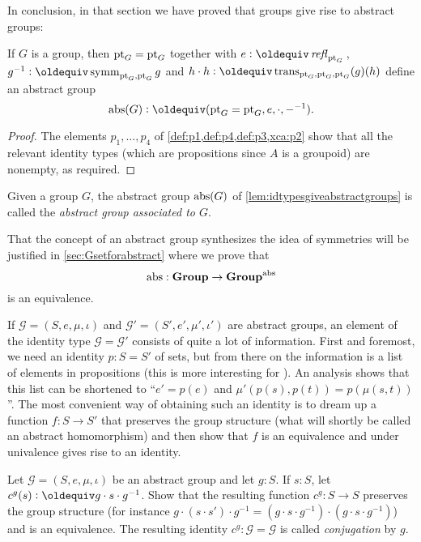 In conclusion, in that section we have proved that groups give rise to
abstract groups:
  \begin{lemma}\label{lem:idtypesgiveabstractgroups}
    If $G$ is a group, then $\mathrm{pt}_G=\mathrm{pt}_G$ together with $e\defequi\refl{\pt_G}{}$, $g^{-1}\defequi\symm_{\pt_G,\pt_G}g$ and $h\cdot h\defequi\trans_{\pt_G,\pt_G,\pt_G}(g)(h)$
define an abstract group
$$\abstr(G)\defequi (\pt_G=\pt_G,e,\cdot,{-}^{-1}).$$
  \end{lemma}
  \begin{proof}
    The elements $p_1,\dots, p_4$ of \cref{def:p1,def:p4,def:p3,xca:p2} show that all the relevant identity types (which are propositions since $A$ is a groupoid) are nonempty, as required.
  \end{proof}
  \begin{definition}\label{def:abstrG}
    Given a group $G$, the abstract group $\mathrm{abs}(G)$ of \cref{lem:idtypesgiveabstractgroups} is called the \emph{abstract group associated to $G$}.
  \end{definition}

 
\begin{remark}
  That the concept of an abstract group synthesizes the idea of symmetries will be justified in \cref{sec:Gsetforabstract} where we prove that 
$$\mathrm{abs}:\mathbf{Group}\to\mathbf{Group}^{\mathrm{abs}}$$
is an equivalence.
\end{remark}
\begin{remark}
  If $\mathcal G=(S,e,\mu,\iota)$ and $\mathcal G'=(S',e',\mu',\iota')$ are abstract groups, an element of the identity type $\mathcal G=\mathcal G'$ consists of quite a lot of information.  First and foremost, we need an identity $p:S=S'$ of sets, but from there on the information is a list of elements in propositions (this is more interesting for \inftygps).  An analysis shows that this list can be shortened to ``$e'=p(e)$ and $\mu'(p(s),p(t))=p(\mu(s,t))$''.  The most convenient way of obtaining such an identity is to dream up a function $f:S\to S'$ that preserves the group structure (\ie what will shortly be called an abstract homomorphism) and then show that $f$ is an equivalence and  under univalence gives rise to an identity.
\end{remark}
\begin{xca}
  \label{xca:conj}
  Let $\mathcal G=(S,e,\mu,\iota)$ be an abstract group and let $g:S$.  If $s:S$, let $c^g(s)\defequi g\cdot s\cdot g^{-1}$.  Show that the resulting function $c^g:S\to S$ preserves the group structure (for instance $g\cdot(s\cdot s')\cdot g^{-1}=(g\cdot s\cdot g^{-1} )\cdot(g\cdot s\cdot g^{-1})$) and is an equivalence.  The resulting identity $c^g:\mathcal G=\mathcal G$ is called \emph{conjugation} by $g$.
\end{xca}

